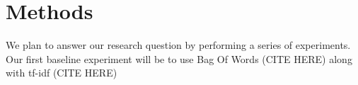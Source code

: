 \documentclass[11pt,a4paper]{article}
\begin{document}
\section{Methods}
We plan to answer our research question by performing a series of experiments. Our first baseline experiment will be to use Bag Of Words (CITE HERE) along with tf-idf (CITE HERE)







\end{document}
